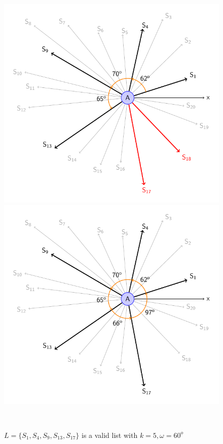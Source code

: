 \begin{figure}[h]
\begin{minipage}{.3\linewidth}
	\end{minipage}
	\hfill
	\begin{minipage}{.3\linewidth}
		\includegraphics[scale=.5]{setSensors_5.pdf}
	\end{minipage}
	\hfill
	\begin{minipage}{.3\linewidth}
		\includegraphics[scale=.5]{setSensors_6.pdf}
	\end{minipage}\\
	\caption{$L=\{S_1, S_4, S_9, S_{13}, S_{17}\}$ is a valid list with $k=5, \omega=60^o$}
	\label{finding}
\end{figure}

